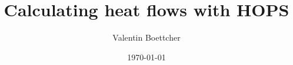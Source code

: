 \documentclass[fontsize=10pt,paper=b5,open=any,
,twoside=true,toc=listof,toc=bibliography,headings=optiontohead,
captions=nooneline,captions=tableabove,english,DIV=calc,numbers=noenddot,final,parskip=half,
headinclude=true,footinclude=false,BCOR=1cm]{scrbook}
\title{Calculating heat flows with HOPS}
\author{Valentin Boettcher}
\date{\today}
\begin{document}
\maketitle
\tableofcontents



\printbibliography{}
\end{document}
